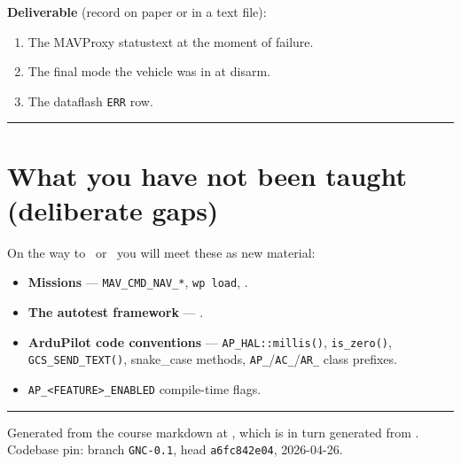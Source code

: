 \documentclass[a4paper,11pt,twoside]{article}
\begin{document}
\textbf{Deliverable} (record on paper or in a text file):
\begin{enumerate}
  \item The MAVProxy statustext at the moment of failure.
  \item The final mode the vehicle was in at disarm.
  \item The dataflash \texttt{ERR} row.
\end{enumerate}

\hrule\bigskip
\section*{What you have not been taught (deliberate gaps)}
On the way to \siblingquadplane\ or \siblingplane\ you will meet these as new material:
\begin{itemize}
  \item \textbf{Missions} --- \texttt{MAV\_CMD\_NAV\_*}, \texttt{wp load}, .
  \item \textbf{The autotest framework} --- .
  \item \textbf{ArduPilot code conventions} --- \texttt{AP\_HAL::millis()}, \texttt{is\_zero()}, \texttt{GCS\_SEND\_TEXT()}, snake\_case methods, \texttt{AP\_}/\texttt{AC\_}/\texttt{AR\_} class prefixes.
  \item \texttt{AP\_<FEATURE>\_ENABLED} compile-time flags.
\end{itemize}

\hrule\bigskip
\noindent\footnotesize Generated from the course markdown at , which is in turn generated from . Codebase pin: branch \texttt{GNC-0.1}, head \texttt{a6fc842e04}, 2026-04-26.
\end{document}

